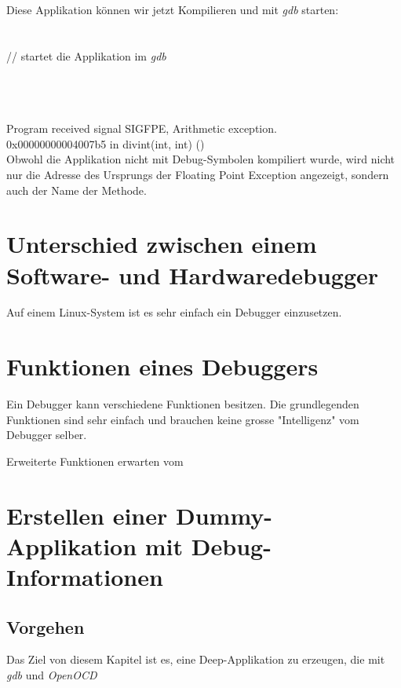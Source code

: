 Diese Applikation können wir jetzt Kompilieren und mit \textit{gdb} starten:\\
\\
\\
        // startet die Applikation im \textit{gdb}

\\
\\
\\
Program received signal SIGFPE, Arithmetic exception.\\
0x00000000004007b5 in divint(int, int) ()\\



Obwohl die Applikation nicht mit Debug-Symbolen kompiliert wurde, wird nicht nur die Adresse des Ursprungs der Floating Point Exception angezeigt, sondern auch der Name der Methode.




\section{Unterschied zwischen einem Software- und Hardwaredebugger}
Auf einem Linux-System ist es sehr einfach ein Debugger einzusetzen.


\section{Funktionen eines Debuggers}
Ein Debugger kann verschiedene Funktionen besitzen.
Die grundlegenden Funktionen sind sehr einfach und brauchen keine grosse "Intelligenz" vom Debugger selber.

Erweiterte Funktionen erwarten vom

\section{Erstellen einer Dummy-Applikation mit Debug-Informationen}
\subsection{Vorgehen}
Das Ziel von diesem Kapitel ist es, eine Deep-Applikation zu erzeugen, die mit \textit{gdb} und \textit{OpenOCD} %